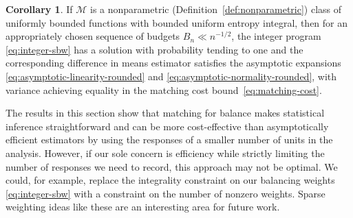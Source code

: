 \documentclass{article}
\theoremstyle{definition}
\newtheorem{corollary}[theorem]{Corollary}
\DeclarePairedDelimiter\round{\lfloor}{\rceil}
\newcommand{\htheta}{\hat\theta}
\newcommand{\model}{\mathcal{M}}
\newcommand{\<}{\langle}
\renewcommand{\>}{\rangle}
\begin{document}
\begin{corollary}
\label{cor:integer-sbw}
If $\model$ is a nonparametric (Definition~\ref{def:nonparametric}) class of uniformly bounded functions with bounded uniform entropy integral, then for an appropriately chosen sequence of budgets $B_n \ll n^{-1/2}$, the integer program \eqref{eq:integer-sbw} has a solution with probability tending to one and the corresponding difference in means estimator \smash{$\hat\psi^{match}=\frac{1}{N_1}\sum_{i=1}^n W_iY_i - \overset{\neg}W_i \round{\htheta}_i Y_i$} satisfies the asymptotic expansions \eqref{eq:asymptotic-linearity-rounded} and \eqref{eq:asymptotic-normality-rounded}, with variance achieving equality in the matching cost bound~\eqref{eq:matching-cost}.
\end{corollary}

The results in this section show that matching for balance makes statistical inference straightforward and can be more cost-effective than asymptotically efficient estimators by using the responses of a smaller number of units in the analysis.
However, if our sole concern is efficiency while strictly limiting the number of responses we need to record, this approach may not be optimal.
We could, for example, replace the integrality constraint on our balancing weights \eqref{eq:integer-sbw} with a constraint on the number of nonzero weights. Sparse weighting ideas like these are an interesting area for future work.

\end{document}
